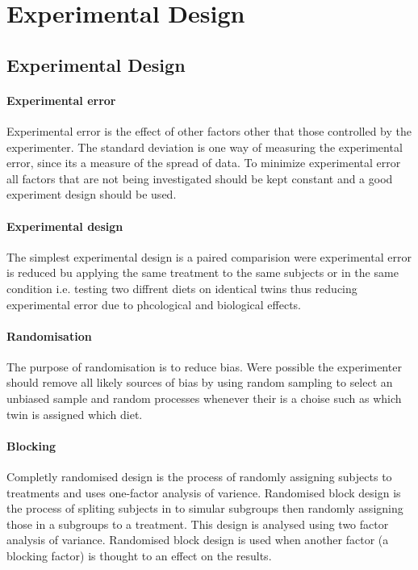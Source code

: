 
\section{Experimental Design}


    \subsection{Experimental Design}
        \paragraph{Experimental error}
        Experimental error is the effect of other factors other that those controlled by the experimenter. The standard deviation is one way of measuring the experimental error, since its a measure of the spread of data. To minimize experimental error all factors that are not being investigated should be kept constant and a good experiment design should be used.

        \paragraph{Experimental design}
        The simplest experimental design is a paired comparision were experimental error is reduced bu applying the same treatment to the same subjects or in the same condition i.e. testing two diffrent diets on identical twins thus reducing experimental error due to phcological and biological effects.

        \paragraph{Randomisation}
        The purpose of randomisation is to reduce bias. Were possible the experimenter should remove all likely sources of bias by using random sampling to select an unbiased sample and random processes whenever their is a choise such as which twin is assigned which diet. 

        \paragraph{Blocking}
        Completly randomised design is the process of randomly assigning subjects to treatments and uses one-factor analysis of varience. Randomised block design is the process of spliting subjects in to simular subgroups then randomly assigning those in a subgroups to a treatment. This design is analysed using two factor analysis of variance. Randomised block design is used when another factor (a blocking factor) is thought to an effect on the results. 

